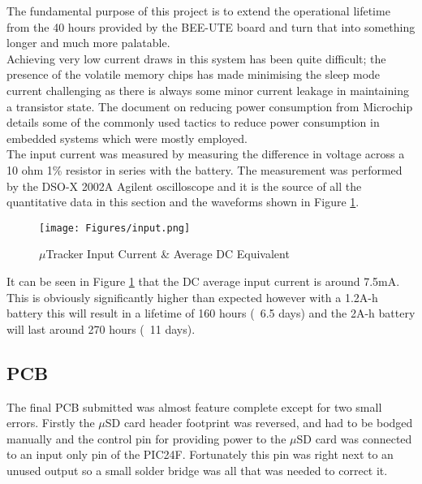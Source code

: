 \documentclass[12pt,openany,a4paper]{book}
\begin{document}
		The fundamental purpose of this project is to extend the operational lifetime from the 40 hours provided by the BEE-UTE board \cite{Freakley13} and turn that into something longer and much more palatable. \\
		
		Achieving very low current draws in this system has been quite difficult; the presence of the volatile memory chips has made minimising the sleep mode current challenging as there is always some minor current leakage in maintaining a transistor state. The document on reducing power consumption from Microchip \cite{PICPWR} details some of the commonly used tactics to reduce power consumption in embedded systems which were mostly employed. \\
		
		The input current was measured by measuring the difference in voltage across a 10 ohm 1\% resistor in series with the battery. The measurement was performed by the DSO-X 2002A Agilent oscilloscope and it is the source of all the quantitative data in this section and the waveforms shown in Figure \ref{fig:input}. \\
		
			\begin{figure}[H]
				\centering
				\texttt{[image: Figures/input.png]}
				\caption{$\mu$Tracker Input Current \& Average DC Equivalent}
				\label{fig:input}
			\end{figure}	
			
		It can be seen in Figure \ref{fig:input} that the DC average input current is around 7.5mA. This is obviously significantly higher than expected however with a 1.2A-h battery this will result in a lifetime of 160 hours (~6.5 days) and the 2A-h battery will last around 270 hours (~11 days). \\
			
		\subsection{PCB} \label{sec:PCBERROR}
		The final PCB submitted was almost feature complete except for two small errors. Firstly the $\mu$SD card header footprint was reversed, and had to be bodged manually and the control pin for providing power to the $\mu$SD card was connected to an input only pin of the PIC24F. Fortunately this pin was right next to an unused output so a small solder bridge was all that was needed to correct it. \\
		
\end{document}
